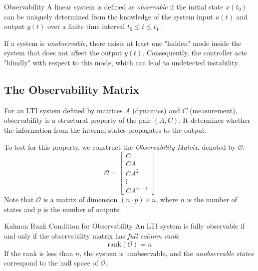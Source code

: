 \begin{defnbox}{Observability}
	A linear system is defined as \emph{observable} if the initial state $x(t_0)$ can be uniquely determined from the knowledge of the system input $u(t)$ and output $y(t)$ over a finite time interval $t_0 \leq t \leq t_1$. 
	
	If a system is \emph{unobservable}, there exists at least one "hidden" mode inside the system that does not affect the output $y(t)$. Consequently, the controller acts "blindly" with respect to this mode, which can lead to undetected instability.
\end{defnbox}

\subsection{The Observability Matrix}
For an LTI system defined by matrices $A$ (dynamics) and $C$ (measurement), observability is a structural property of the pair $(A, C)$. It determines whether the information from the internal states propagates to the output.

To test for this property, we construct the \emph{Observability Matrix}, denoted by $\mathcal{O}$:
\begin{equation*}
	\mathcal{O} = 
	\begin{bmatrix}
		C \\
		CA \\
		CA^2 \\
		\vdots \\
		CA^{n-1}
	\end{bmatrix}
\end{equation*}
Note that $\mathcal{O}$ is a matrix of dimension $(n \cdot p) \times n$, where $n$ is the number of states and $p$ is the number of outputs.

\begin{notebox}{Kalman Rank Condition for Observability}
	An LTI system is fully observable if and only if the observability matrix has \emph{full column rank}:
	\begin{equation*}
		\text{rank}(\mathcal{O}) = n
	\end{equation*}
	If the rank is less than $n$, the system is unobservable, and the \emph{unobservable states} correspond to the null space of $\mathcal{O}$.
\end{notebox}

